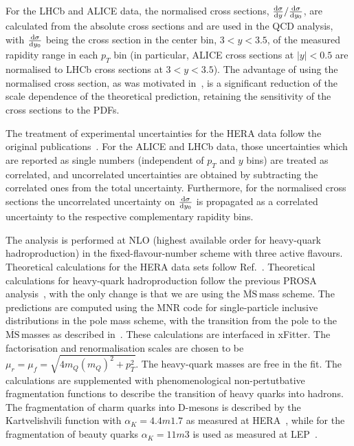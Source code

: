 \documentclass[12pt]{article}
\newcommand{\msbar}{$\overline{\text{MS}}\, $}
\begin{document}
For the LHCb and ALICE data, the normalised cross sections, $\frac{{\rm d}\sigma}{{\rm d}y} / \frac{{\rm d}\sigma}{{\rm d}y_0}$, are calculated from the absolute cross sections and are used in the 
QCD analysis, with $\frac{{\rm d}\sigma}{{\rm d}y_0}$ being the cross section in the center bin, $3 < y < 3.5$, of 
the measured rapidity range in each $p_T$ bin (in particular, ALICE cross sections at $|y| < 0.5$ are normalised to LHCb cross sections at $3 < y < 3.5$). 
The advantage of using the normalised cross section, as was motivated in~\cite{}, is a significant
reduction of the scale dependence of the theoretical prediction, retaining the sensitivity of the cross sections to 
the PDFs. 

The treatment of experimental uncertainties for the HERA data follow the original publications~\cite{}.
For the ALICE and LHCb data, those uncertainties which are reported as single numbers (independent of $p_T$ and $y$ bins) are treated as correlated, and uncorrelated uncertainties are obtained by subtracting the correlated ones from the total uncertainty. Furthermore, for the normalised cross sections the uncorrelated uncertainty 
on $\frac{{\rm d}\sigma}{{\rm d}y_0}$ is propagated as a correlated uncertainty to the respective complementary 
rapidity bins. 

The analysis is performed at NLO (highest available order for heavy-quark hadroproduction) in the fixed-flavour-number scheme with three active flavours.
Theoretical calculations for the HERA data sets follow Ref.~\cite{}.
Theoretical calculations for heavy-quark hadroproduction follow the previous PROSA analysis~\cite{}, with the only change is that we are using the \msbar mass scheme.
The predictions are computed using the MNR code for single-particle inclusive distributions in the pole mass scheme, with the transition from the pole to the \msbar masses as described in~\cite{}. These calculations are interfaced in xFitter. The factorisation and renormalisation scales are chosen to be $\mu_r = \mu_f = \sqrt{4m_Q(m_Q)^2+p_T^2}$. The heavy-quark masses are free in the fit. The calculations are supplemented with phenomenological non-pertutbative fragmentation functions to describe the transition of heavy quarks into hadrons. The fragmentation of charm quarks into D-mesons is described by the Kartvelishvili function with $\alpha_K = 4.4 m 1.7$ as measured at HERA~\cite{},
while for the fragmentation of beauty quarks $\alpha_K = 11 m 3$ is used as measured at LEP~\cite{}.
\end{document}
